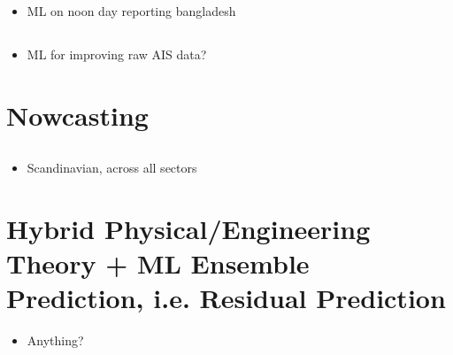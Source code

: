 \documentclass{article}
\newcommand{\paperpath}{../resources/}
\newcommand{\myhref}[2]{\href{run:\paperpath#1}{#2}}
\begin{document}
\subsection{\myhref{Monisha et al 2023 - A STEP TOWARDS IMO GREENHOUSE GAS REDUCTION GOAL.pdf}{\textcite{monisha2023step}}}
\begin{itemize}
    \item ML on noon day reporting bangladesh
\end{itemize}
\subsection{\myhref{Yang et al 2024 - Harnessing the power of Machine learning for AIS Data-Driven.pdf}{\textcite{yang2024harnessing}}}
\begin{itemize}
    \item ML for improving raw AIS data?
\end{itemize}

\section{Nowcasting}
\subsection{\href{https://play.google.com/books/reader?id=gHOVEAAAQBAJ&pg=GBS.PA2&hl=en}{\textcite{pandis2022nowcasting}}}
\begin{itemize}
    \item Scandinavian, across all sectors
\end{itemize}
\subsection{\myhref{IMF Arslanalp et al 2019 - Big Data on Vessel Traffic.pdf}{\textcite{arslanalp2019big}}}
\subsection{\myhref{IMF Cerdeiro 2020 - World Seaborne Trade in Real Time.pdf}{\textcite{cerdeiro2020world}}}

\section{Hybrid Physical/Engineering Theory + ML Ensemble Prediction, i.e. Residual Prediction}
\begin{itemize}
    \item Anything?
\end{itemize}
\end{document}
